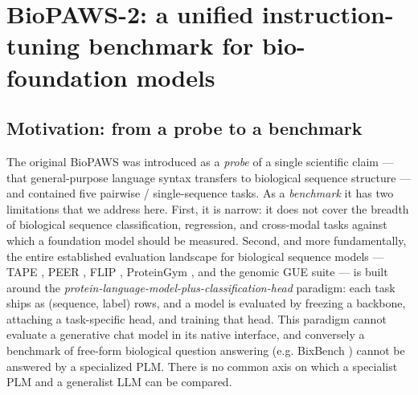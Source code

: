 
\section{BioPAWS-2: a unified instruction-tuning benchmark for bio-foundation models}
\label{sec:biopaws2}

\subsection{Motivation: from a probe to a benchmark}

The original BioPAWS \citep{wang2026biopaws} was introduced as a \emph{probe} of a single
scientific claim --- that general-purpose language syntax transfers to biological
sequence structure --- and contained five pairwise / single-sequence tasks. As a
\emph{benchmark} it has two limitations that we address here. First, it is narrow: it does
not cover the breadth of biological sequence classification, regression, and cross-modal
tasks against which a foundation model should be measured. Second, and more fundamentally,
the entire established evaluation landscape for biological sequence models --- TAPE
\citep{rao2019tape}, PEER \citep{xu2022peer}, FLIP \citep{dallago2021flip}, ProteinGym
\citep{notin2023proteingym}, and the genomic GUE suite \citep{zhou2023dnabert2} --- is
built around the \emph{protein-language-model-plus-classification-head} paradigm: each task
ships as (sequence, label) rows, and a model is evaluated by freezing a backbone, attaching
a task-specific head, and training that head. This paradigm cannot evaluate a generative
chat model in its native interface, and conversely a benchmark of free-form biological
question answering (e.g. BixBench \citep{bixbench2024}) cannot be answered by a specialized
PLM. There is no common axis on which a specialist PLM and a generalist LLM can be compared.

